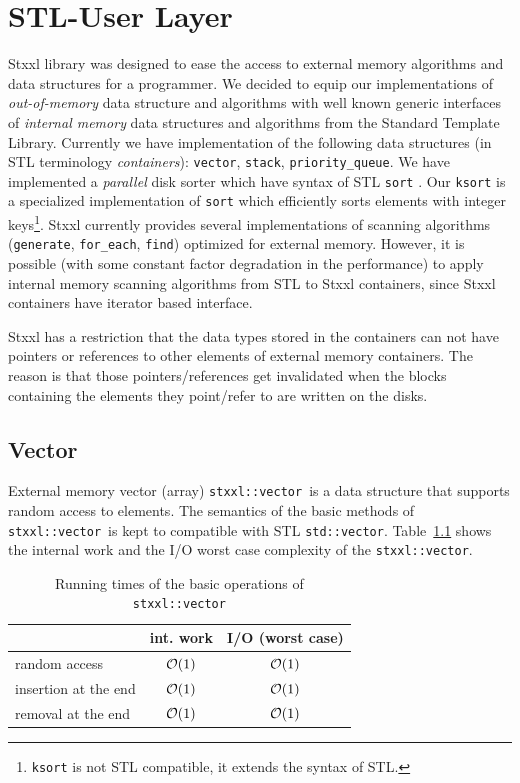 \documentclass[twoside]{book}
\newcommand{\stxxl}{{\sc Stxxl} }
\begin{document}
\chapter{STL-User Layer}
\stxxl library was designed to ease the access to external memory
algorithms and data structures for a programmer. We decided to
equip our implementations of \emph{out-of-memory} data structure and
algorithms with well known generic interfaces of \emph{internal memory}
data structures and algorithms from the Standard Template Library.
Currently we have implementation of the following data structures (in
STL terminology \emph{containers}):
\texttt{vector}, \texttt{stack}, \texttt{priority\_queue}. We
have implemented a \emph{parallel} disk sorter which have syntax of
STL \texttt{sort} \cite{DemSan03}. Our \texttt{ksort} is a specialized
implementation 
of \texttt{sort} which efficiently sorts elements with integer
keys\footnote{\texttt{ksort} is not STL compatible, it extends the
syntax of STL.}. \stxxl currently provides several implementations of
scanning algorithms (\texttt{generate}, \texttt{for\_each},
\texttt{find}) optimized for external memory. However, it is possible
(with some constant factor degradation in the performance) to apply
internal memory scanning algorithms from STL to \stxxl 
containers, since \stxxl containers have iterator based interface.

\stxxl has a restriction that the data types stored in the containers
can not have pointers or references to other elements of external memory
containers. The reason is that those pointers/references get
invalidated when the blocks containing the elements they point/refer to are
written on the disks.


\newcommand{\xvector}{\texttt{stxxl::vector}}

\section{Vector}
External memory vector (array)
\xvector\ is a data structure 
that supports random access to elements. The semantics of the basic
methods of \xvector\ is kept to compatible with STL
\texttt{std::vector}. Table~\ref{rtvector} shows the internal work and
the I/O worst case complexity of the \xvector.

\begin{table}
\begin{center}
\caption{Running times of the basic operations of \xvector}
\label{rtvector}
\begin{tabular}{|l|c|c|}
\hline
                    & int. work & I/O (worst case) \\
\hline\hline
random access       & $\mathcal{O}\!\left( 1\right)$ & $\mathcal{O}\!\left( 1\right)$\\
\hline
insertion at the end& $\mathcal{O}\!\left( 1\right)$ & $\mathcal{O}\!\left( 1\right)$\\
\hline
removal at the end  & $\mathcal{O}\!\left( 1\right)$ & $\mathcal{O}\!\left( 1\right)$ \\
\hline
\end{tabular}
\end{center}
\end{table}
\end{document}

